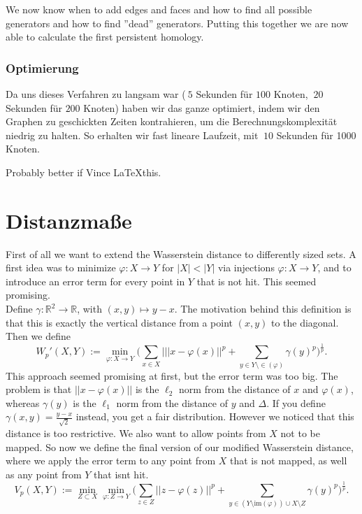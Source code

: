 \documentclass[11pt, a4paper,draft]{report}
\newcommand{\bR}{\mathbb{R}}
\newcommand{\im}{\textrm{im}}
\begin{document}
We now know when to add edges and faces and how to find all possible generators and how to find ''dead'' generators. Putting this together we are now able to calculate the first persistent homology.
 	
 	\subsection{Optimierung}
 	
 	Da uns dieses Verfahren zu langsam war ($~5$ Sekunden für $100$ Knoten, $~20$ Sekunden für $200$ Knoten) haben wir das ganze optimiert, indem wir den Graphen zu geschickten Zeiten kontrahieren, um die Berechnungskomplexität niedrig zu halten. So erhalten wir fast lineare Laufzeit, mit $~10$ Sekunden für 1000 Knoten.
 	
 	Probably better if Vince \LaTeX this.
 	
 	\chapter{Distanzmaße}
 	
 	First of all we want to extend the Wasserstein distance to differently sized sets. A first idea was to minimize $\varphi:X\rightarrow Y$ for $|X|<|Y|$ via injections $\varphi:X\rightarrow Y$, and to introduce an error term for every point in $Y$ that is not hit. This seemed promising.\\
Define $\gamma:\bR^2\rightarrow\bR$, with $(x,y)\mapsto y-x$. The motivation behind this definition is that this is exactly the vertical distance from a point $(x,y)$ to the diagonal. Then we define $$W_p'(X,Y):=\min_{\varphi:X\rightarrow Y}\bigg(\sum_{x\in X}|||x-\varphi(x)||^p + \sum_{y\in Y\setminus \in(\varphi)}\gamma(y)^p\bigg)^\frac{1}{p}.$$
This approach seemed promising at first, but the error term was too big. The problem is that $||x-\varphi(x)||$ is the $\ell_2$ norm from the distance of $x$ and $\varphi(x)$, whereas $\gamma(y)$ is the $\ell_1$ norm from the distance of $y$ and $\Delta$. If you define $\gamma(x,y)=\frac{y-x}{\sqrt{2}}$ instead, you get a fair distribution. However we noticed that this distance is too restrictive. We also want to allow points from $X$ not to be mapped. So now we define the final version of our modified Wasserstein distance, where we apply the error term to any point from $X$ that is not mapped, as well as any point from $Y$ that isnt hit.
$$V_p(X,Y):=\min_{Z\subset{X}}\min_{\varphi:Z\rightarrow Y}\bigg(\sum_{z\in Z}||z-\varphi(z)||^p + \sum_{y\in (Y\setminus \im(\varphi))\cup X\setminus Z}\gamma(y)^p\bigg)^\frac{1}{p}.$$
\end{document}
